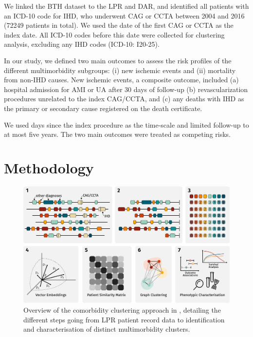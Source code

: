 We linked the \ac{BTH} dataset to the \ac{LPR} and \ac{DAR}, 
and identified all patients with an \ac{ICD-10} code for \ac{IHD},
who underwent \ac{CAG} or \ac{CCTA} between 2004 and 2016 
(\num{72249} patients in total).
We used the date of the first \ac{CAG} or \ac{CCTA} as the index date. 
All \ac{ICD-10} codes before this date were collected
for clustering analysis, excluding any \ac{IHD} codes (\ac{ICD-10}: I20-25).

In our study, we defined two main outcomes to assess the risk
profiles of the different multimorbidity subgroups: (i) new ischemic events
and (ii) mortality from non-\ac{IHD} causes.
New ischemic events, a composite outcome, included 
(a) hospital admission for \ac{AMI} or \ac{UA} after 30 days of follow-up
(b) revascularization procedures unrelated to the index \ac{CAG}/\ac{CCTA},
and (c) any deaths with \ac{IHD} as the primary or secondary
cause registered on the death certificate.

We used days since the index procedure as the time-scale and limited 
follow-up to at most five years. The two main outcomes were treated
as competing risks.

\section{Methodology}

\begin{figure}[tp]
    \includegraphics{graphics/clustering-overview.pdf}
    \caption[Overview of the comorbidity clustering approach]{%
        Overview of the comorbidity clustering approach in \studyi{},
        detailing the different steps going from \ac{LPR} patient record data
        to identification and characterisation of distinct 
        multimorbidity clusters. 
    }
    \label{fig:dishisclust}
\end{figure}

